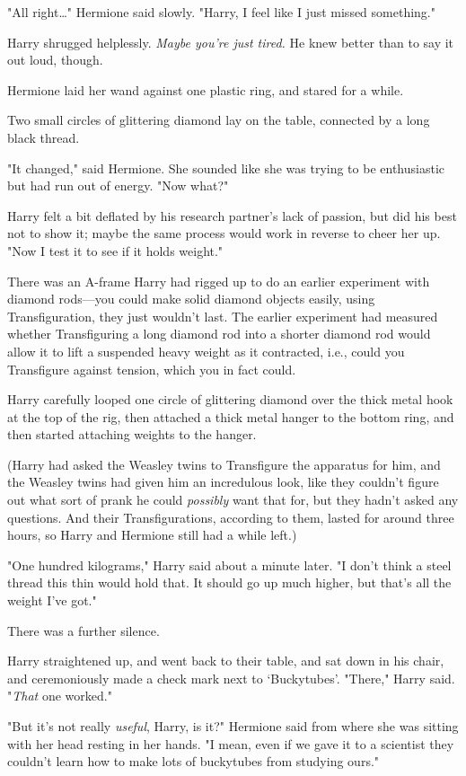"All right{\ldots}" Hermione said slowly. "Harry, I feel like I just missed
something."

Harry shrugged helplessly. \emph{Maybe you're just tired.} He knew better than
to say it out loud, though.

Hermione laid her wand against one plastic ring, and stared for a while.

Two small circles of glittering diamond lay on the table, connected by a long
black thread.

"It changed," said Hermione. She sounded like she was trying to be enthusiastic
but had run out of energy. "Now what?"

Harry felt a bit deflated by his research partner's lack of passion, but did
his best not to show it; maybe the same process would work in reverse to cheer
her up. "Now I test it to see if it holds weight."

There was an A-frame Harry had rigged up to do an earlier experiment with
diamond rods---you could make solid diamond objects easily, using
Transfiguration, they just wouldn't last. The earlier experiment had measured
whether Transfiguring a long diamond rod into a shorter diamond rod would allow
it to lift a suspended heavy weight as it contracted, i.e., could you
Transfigure against tension, which you in fact could.

Harry carefully looped one circle of glittering diamond over the thick metal
hook at the top of the rig, then attached a thick metal hanger to the bottom
ring, and then started attaching weights to the hanger.

(Harry had asked the Weasley twins to Transfigure the apparatus for him, and
the Weasley twins had given him an incredulous look, like they couldn't figure
out what sort of prank he could \emph{possibly} want that for, but they hadn't
asked any questions. And their Transfigurations, according to them, lasted for
around three hours, so Harry and Hermione still had a while left.)

"One hundred kilograms," Harry said about a minute later. "I don't think a
steel thread this thin would hold that. It should go up much higher, but that's
all the weight I've got."

There was a further silence.

Harry straightened up, and went back to their table, and sat down in his chair,
and ceremoniously made a check mark next to `Buckytubes'. "There," Harry said.
"\emph{That} one worked."

"But it's not really \emph{useful}, Harry, is it?" Hermione said from where she
was sitting with her head resting in her hands. "I mean, even if we gave it to
a scientist they couldn't learn how to make lots of buckytubes from studying
ours."

